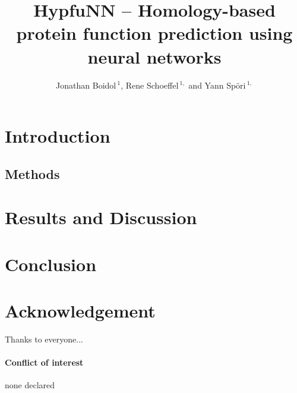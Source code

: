 \documentclass{bioinfo}
\begin{document}

\title[Homology-based function prediction]{HypfuNN -- Homology-based protein function prediction using neural networks}
\author[]{Jonathan Boidol\,$^{1}$, Rene Schoeffel\,$^{1,}$ and Yann Sp\"ori\,$^{1,}$}
\address{$^{1}$TUM (Technische Universit\"at M\"unchen) Department of Informatics, Bioinformatics \& Computational Biology - i12, Boltzmannstr.~3, 85748 Garching/Munich, Germany}
\history{}

\editor{}

\maketitle



\section{Introduction}



\begin{methods}
\section{Methods}



\end{methods}
\section{Results and Discussion}



\section{Conclusion}




\section*{Acknowledgement}
Thanks to everyone...
\paragraph{Conflict of interest\textcolon} none declared



\end{document}
